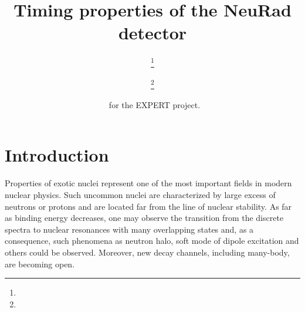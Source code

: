 \documentclass{webofc}
\begin{document}
\title{Timing properties of the NeuRad detector}

\author{ \fnsep\thanks{} \and
	 \fnsep\thanks{} \and
	  \and
	  \and
	  \and
	  \and
	  \and
	  \and
	  \and
	  \ for the EXPERT project.
}
%
\maketitle
%
\section{Introduction}
Properties of exotic nuclei represent one of the most important fields in modern nuclear physics.
Such uncommon nuclei are characterized by large excess of neutrons or protons and are located far from the line of nuclear stability. As far as binding energy decreases, one may observe the transition from the discrete spectra to nuclear resonances with many overlapping states and, as a consequence, such phenomena as neutron halo, soft mode of dipole excitation and others could be observed. Moreover, new decay channels, including many-body, are becoming open.
\end{document}
